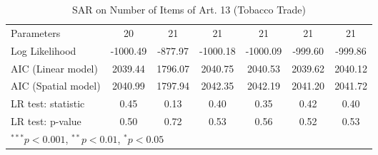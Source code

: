 \begin{table}[!h]
\begin{center}
\begin{tabular}{l c c c c c c }
Parameters              & 20           & 21           & 21           & 21           & 21           & 21           \\
Log Likelihood          & -1000.49     & -877.97      & -1000.18     & -1000.09     & -999.60      & -999.86      \\
AIC (Linear model)      & 2039.44      & 1796.07      & 2040.75      & 2040.53      & 2039.62      & 2040.12      \\
AIC (Spatial model)     & 2040.99      & 1797.94      & 2042.35      & 2042.19      & 2041.20      & 2041.72      \\
LR test: statistic      & 0.45         & 0.13         & 0.40         & 0.35         & 0.42         & 0.40         \\
LR test: p-value        & 0.50         & 0.72         & 0.53         & 0.56         & 0.52         & 0.53         \\
\bottomrule
\multicolumn{7}{l}{\scriptsize{$^{***}p<0.001$, $^{**}p<0.01$, $^*p<0.05$}}
\end{tabular}
\caption{SAR on Number of Items of Art. 13 (Tobacco Trade)}
\label{table:coefficients}
\end{center}
\end{table}
